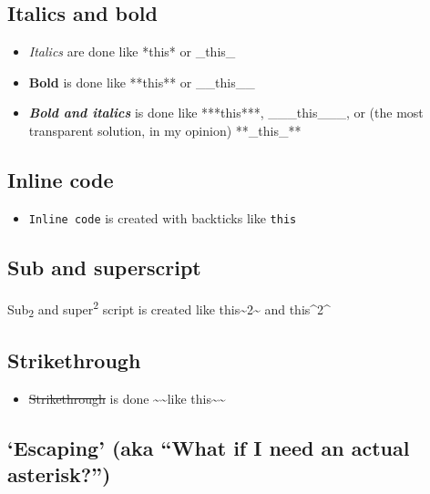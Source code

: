 \documentclass[a4paper, twoside]{templates/ociamthesis}
\providecommand{\tightlist}{%
  \setlength{\itemsep}{0pt}\setlength{\parskip}{0pt}}
\begin{document}
\hypertarget{italics-and-bold}{%
\subsection{Italics and bold}\label{italics-and-bold}}

\begin{itemize}
\tightlist
\item
  \emph{Italics} are done like *this* or \_this\_
\item
  \textbf{Bold} is done like **this** or \_\_this\_\_
\item
  \textbf{\emph{Bold and italics}} is done like ***this***, \_\_\_this\_\_\_, or (the most transparent solution, in my opinion) **\_this\_**
\end{itemize}

\hypertarget{inline-code}{%
\subsection{Inline code}\label{inline-code}}

\begin{itemize}
\tightlist
\item
  \texttt{Inline\ code} is created with backticks like \texttt{\textasciigrave{}this\textasciigrave{}}
\end{itemize}

\hypertarget{sub-and-superscript}{%
\subsection{Sub and superscript}\label{sub-and-superscript}}

Sub\textsubscript{2} and super\textsuperscript{2} script is created like this\textasciitilde2\textasciitilde{} and this\^{}2\^{}

\hypertarget{strikethrough}{%
\subsection{Strikethrough}\label{strikethrough}}

\begin{itemize}
\tightlist
\item
  \sout{Strikethrough} is done \textasciitilde\textasciitilde like this\textasciitilde\textasciitilde{}
\end{itemize}

\hypertarget{escaping-aka-what-if-i-need-an-actual-asterisk}{%
\subsection{`Escaping' (aka ``What if I need an actual asterisk?'')}\label{escaping-aka-what-if-i-need-an-actual-asterisk}}
\end{document}
